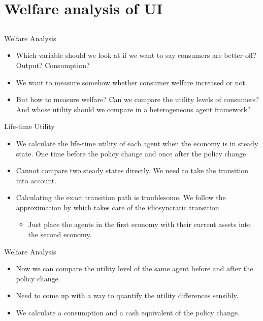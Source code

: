 \documentclass{beamer}
\begin{document}
\section{Welfare analysis of UI}
\subsection{}
\begin{frame}{Welfare Analysis}
  \begin{itemize}
  \item {
  Which variable should we look at if we want to say consumers are better off? Output? Consumption?
  }
  \item {
  We want to measure somehow whether consumer welfare increased or not.
  }
  \item {
  But how to measure welfare? Can we compare the utility levels of consumers? And whose utility should we compare in a heterogeneous agent framework?
  }
  \end{itemize}
\end{frame}

\begin{frame}{Life-time Utility}
  \begin{itemize}
  \item {
  We calculate the life-time utility of each agent when the economy is in steady state. One time before the policy change and once after the policy change.
  }
  \item {
  Cannot compare two steady states directly. We need to take the transition into account.
  }
  \item {
  Calculating the exact transition path is troublesome. We follow the approximation by \citeauthor{sahin} \cite{sahin} which takes care of the idiosyncratic transition.
  }
    \begin{itemize}
    \item {
    Just place the agents in the first economy with their current assets into the second economy.
    }
    \end{itemize}
  \end{itemize}
\end{frame}

\begin{frame}{Welfare Analysis}
  \begin{itemize}
  \item {
  Now we can compare the utility level of the same agent before and after the policy change.
  }
  \item {
  Need to come up with a way to quantify the utility differences sensibly.
  }
  \item {
  We calculate a consumption and a cash equivalent of the policy change.
  }
  \end{itemize}
\end{frame}
\end{document}
